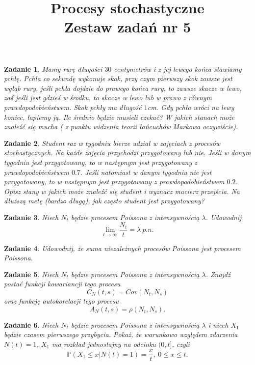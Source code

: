 \documentclass[12pt]{article}
\title{Procesy stochastyczne\\ Zestaw zadań nr 5}
\newtheorem{zd}{Zadanie}
\begin{document}
\maketitle

\begin{zd}
	Mamy rurę długości $30$ centymetrów i z jej lewego końca stawiamy pchłę. Pchła co sekundę wykonuje skok, przy czym pierwszy skok zawsze jest wgłąb rury, jeśli pchła dojdzie do prawego końca rury, to zawsze skacze w lewo, zaś jeśli jest gdzieś w środku, to skacze w lewo lub w prawo z równym prawdopodobieństwem. Skok pchły ma długość $1$cm. Gdy pchła wróci na lewy koniec, łapiemy ją. Ile średnio będzie musieli czekać? W jakich stanach może znaleźć się mucha ( z punktu widzenia teorii łańcuchów Markowa oczywiście).
\end{zd}
\begin{zd}
	Student raz w tygodniu bierze udział w zajęciach z procesów stochastycznych. Na każde zajęcia przychodzi przygotowany lub nie. Jeśli w danym tygodniu jest przygotowany, to w następnym jest przygotowany z prawdopodobieństwem $0.7$. Jeśli natomiast w danym tygodniu nie jest przygotowany, to w następnym jest przygotowany z prawdopodobieństwem $0.2$. Opisz stany w jakich może znaleźć się student i wyznacz macierz przejścia. Na dłuższą metę (bardzo długą), jak często student jest przygotowany?
\end{zd}
\begin{zd}
	Niech $N_t$ będzie procesem Poissona z intensywnością $\lambda$. Udowodnij
	\begin{displaymath}
	\lim_{t\to \infty}\frac{N_t}{t} = \lambda\ p.n.
	\end{displaymath}
\end{zd}
\begin{zd}
	Udowodnij, że suma niezależnych procesów Poissona jest procesem Poissona.
\end{zd}
\begin{zd}
Niech $N_t$ będzie procesem Poissona z intensywnością $\lambda$. Znajdź postać funkcji kowariancji tego procesu
\begin{displaymath}
C_N(t,s) = Cov(N_t, N_s) 
\end{displaymath}
oraz funkcję autokorelacji tego procesu
\begin{displaymath}
	A_N(t,s) = \rho\left(N_t, N_s\right).
\end{displaymath}
\end{zd}
\begin{zd}
	Niech $N_t$ będzie procesem Poissona z intensywnością $\lambda$ i niech $X_1$ będzie czasem pierwszego przybycia. Pokaż, że warunkowo względem zdarzenia $N(t) = 1$, $X_1$ ma rozkład jednostajny na odcinku $(0,t]$, czyli
	\begin{displaymath}
	\mathbb{P}\left(X_1 \leq x|N(t) = 1\right) = \frac{x}{t},\ 0\leq x\leq t.
	\end{displaymath}
\end{zd}
\end{document}
